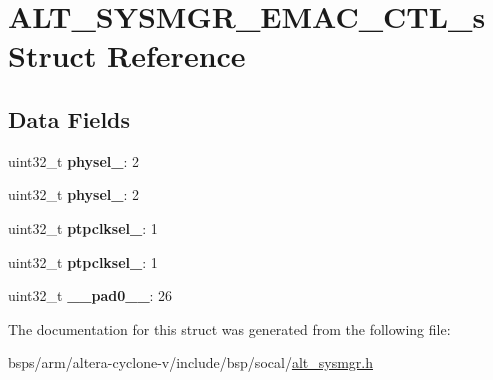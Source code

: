 \hypertarget{structALT__SYSMGR__EMAC__CTL__s}{}\section{A\+L\+T\+\_\+\+S\+Y\+S\+M\+G\+R\+\_\+\+E\+M\+A\+C\+\_\+\+C\+T\+L\+\_\+s Struct Reference}
\label{structALT__SYSMGR__EMAC__CTL__s}
\subsection*{Data Fields}
\begin{DoxyCompactItemize}
\item 
\mbox{\label{structALT__SYSMGR__EMAC__CTL__s_a5371981b8f86f6adefa51ff5bd4758e0}} 
uint32\+\_\+t {\bfseries physel\+\_}\+: 2
\item 
\mbox{\label{structALT__SYSMGR__EMAC__CTL__s_a0e0e4100d15a81768cedfbbe032e1c40}} 
uint32\+\_\+t {\bfseries physel\+\_}\+: 2
\item 
\mbox{\label{structALT__SYSMGR__EMAC__CTL__s_ad7a7f1fbdf43cdf54bd1f13f7bb7eab3}} 
uint32\+\_\+t {\bfseries ptpclksel\+\_}\+: 1
\item 
\mbox{\label{structALT__SYSMGR__EMAC__CTL__s_a49dde0d6eeddcdb82f37471b225aaf4e}} 
uint32\+\_\+t {\bfseries ptpclksel\+\_}\+: 1
\item 
\mbox{\label{structALT__SYSMGR__EMAC__CTL__s_a7ab3b9b6b58347de0b3a52eb2419d5e6}} 
uint32\+\_\+t {\bfseries \+\_\+\+\_\+pad0\+\_\+\+\_\+}\+: 26
\end{DoxyCompactItemize}


The documentation for this struct was generated from the following file\+:\begin{DoxyCompactItemize}
\item 
bsps/arm/altera-\/cyclone-\/v/include/bsp/socal/\mbox{\hyperlink{alt__sysmgr_8h}{alt\+\_\+sysmgr.\+h}}\end{DoxyCompactItemize}
